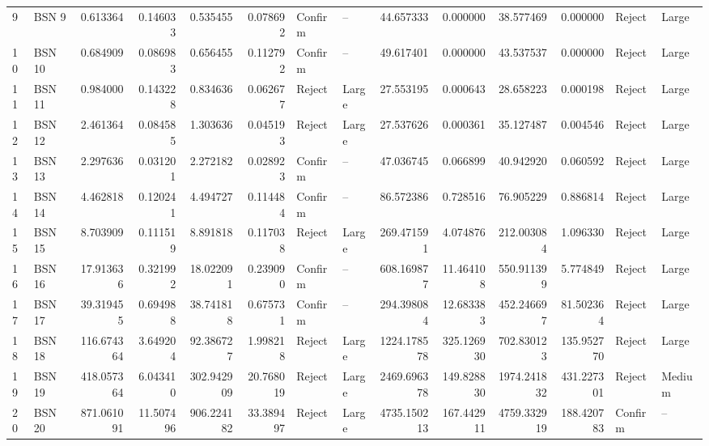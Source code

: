 \begin{tabular}{llrrrrllrrrrll}
9  &   BSN 9 &           0.613364 &   0.146033 &            0.535455 &   0.078692 &  Confirm &          -- &                44.657333 &    0.000000 &                 38.577469 &    0.000000 &   Reject &       Large \\
10 &  BSN 10 &           0.684909 &   0.086983 &            0.656455 &   0.112792 &  Confirm &          -- &                49.617401 &    0.000000 &                 43.537537 &    0.000000 &   Reject &       Large \\
11 &  BSN 11 &           0.984000 &   0.143228 &            0.834636 &   0.062677 &   Reject &       Large &                27.553195 &    0.000643 &                 28.658223 &    0.000198 &   Reject &       Large \\
12 &  BSN 12 &           2.461364 &   0.084585 &            1.303636 &   0.045193 &   Reject &       Large &                27.537626 &    0.000361 &                 35.127487 &    0.004546 &   Reject &       Large \\
13 &  BSN 13 &           2.297636 &   0.031201 &            2.272182 &   0.028923 &  Confirm &          -- &                47.036745 &    0.066899 &                 40.942920 &    0.060592 &   Reject &       Large \\
14 &  BSN 14 &           4.462818 &   0.120241 &            4.494727 &   0.114484 &  Confirm &          -- &                86.572386 &    0.728516 &                 76.905229 &    0.886814 &   Reject &       Large \\
15 &  BSN 15 &           8.703909 &   0.111519 &            8.891818 &   0.117038 &   Reject &       Large &               269.471591 &    4.074876 &                212.003084 &    1.096330 &   Reject &       Large \\
16 &  BSN 16 &          17.913636 &   0.321992 &           18.022091 &   0.239090 &  Confirm &          -- &               608.169877 &   11.464108 &                550.911399 &    5.774849 &   Reject &       Large \\
17 &  BSN 17 &          39.319455 &   0.694988 &           38.741818 &   0.675731 &  Confirm &          -- &               294.398084 &   12.683383 &                452.246697 &   81.502364 &   Reject &       Large \\
18 &  BSN 18 &         116.674364 &   3.649204 &           92.386727 &   1.998218 &   Reject &       Large &              1224.178578 &  325.126930 &                702.830123 &  135.952770 &   Reject &       Large \\
19 &  BSN 19 &         418.057364 &   6.043410 &          302.942909 &  20.768019 &   Reject &       Large &              2469.696378 &  149.828830 &               1974.241832 &  431.227301 &   Reject &      Medium \\
20 &  BSN 20 &         871.061091 &  11.507496 &          906.224182 &  33.389497 &   Reject &       Large &              4735.150213 &  167.442911 &               4759.332919 &  188.420783 &  Confirm &          -- \\
\bottomrule
\end{tabular}
